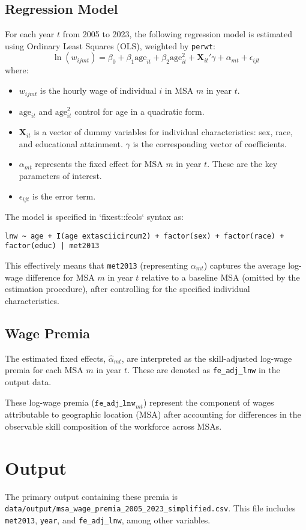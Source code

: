 \documentclass{article}
\begin{document}
\subsection{Regression Model}
For each year $t$ from 2005 to 2023, the following regression model is estimated using Ordinary Least Squares (OLS), weighted by \texttt{perwt}:
\begin{equation}
    \ln(w_{ijmt}) = \beta_0 + \beta_1 \text{age}_{it} + \beta_2 \text{age}_{it}^2 + \mathbf{X}_{it}'\gamma + \alpha_{mt} + \epsilon_{ijt}
    \label{eq:main_regression}
\end{equation}
where:
\begin{itemize}
    \item $w_{ijmt}$ is the hourly wage of individual $i$ in MSA $m$ in year $t$.
    \item $\text{age}_{it}$ and $\text{age}_{it}^2$ control for age in a quadratic form.
    \item $\mathbf{X}_{it}$ is a vector of dummy variables for individual characteristics: sex, race, and educational attainment. $\gamma$ is the corresponding vector of coefficients.
    \item $\alpha_{mt}$ represents the fixed effect for MSA $m$ in year $t$. These are the key parameters of interest.
    \item $\epsilon_{ijt}$ is the error term.
\end{itemize}
The model is specified in `fixest::feols` syntax as:

\texttt{lnw \textasciitilde{} age + I(age	extasciicircum{}2) + factor(sex) + factor(race) + factor(educ) | met2013}

This effectively means that \texttt{met2013} (representing $\alpha_{mt}$) captures the average log-wage difference for MSA $m$ in year $t$ relative to a baseline MSA (omitted by the estimation procedure), after controlling for the specified individual characteristics.

\subsection{Wage Premia}
The estimated fixed effects, $\hat{\alpha}_{mt}$, are interpreted as the skill-adjusted log-wage premia for each MSA $m$ in year $t$. These are denoted as \texttt{fe\_adj\_lnw} in the output data. 

These log-wage premia ($ \texttt{fe\_adj\_lnw}_{mt} $) represent the component of wages attributable to geographic location (MSA) after accounting for differences in the observable skill composition of the workforce across MSAs.

\section{Output}
The primary output containing these premia is \texttt{data/output/msa\_wage\_premia\_2005\_2023\_simplified.csv}. This file includes \texttt{met2013}, \texttt{year}, and \texttt{fe\_adj\_lnw}, among other variables.
\end{document}
